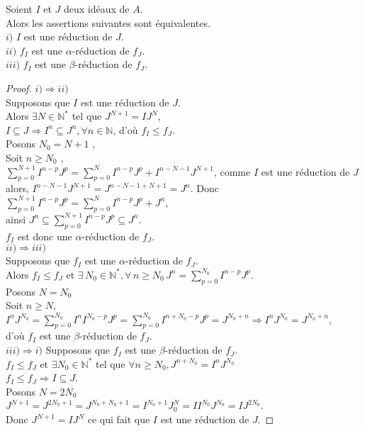 \begin{maproposition}
	Soient $I$ et $J$ deux idéaux de $A$.\\
	Alors les assertions suivantes sont équivalentes.\\
	$i)$ $I$ est une réduction de $J$.\\
	$ii)$ $f_I$ est une $\alpha$-réduction de $f_J$.\\
	$iii)$ $f_I$ est une $\beta$-réduction de $f_J$.
\end{maproposition}
\begin{proof}
	$i) \Rightarrow ii)$\\
	Supposons que $I$ est une réduction de $J$.\\
	Alors $\exists N \in \mathbb{N^*}$ tel que $J^{N+1} = IJ^N$,\\ $I \subseteq J \Rightarrow I^n \subseteq J^n , \forall n \in \mathbb{N}$, d'où $f_I \leq f_J$.\\
	Posons $N_0 = N+1$ , \\
	Soit $n \geq N_0$ , \\
	$\displaystyle \sum_{p=0}^{N+1}{I^{n-p} J^{p}} = \displaystyle \sum_{p=0}^{N}{I^{n-p} J^{p}} + I^{n-N-1} J^{N+1}$, comme $I$ est une réduction de $J$ alors, $I^{n-N-1} J^{N+1} = J^{n-N-1+N+1} = J^n$. Donc $\displaystyle \sum_{p=0}^{N+1}{I^{n-p} J^{p}} = \displaystyle \sum_{p=0}^{N}{I^{n-p} J^{p}} + J^{n}$,\\ ainsi $J^n \subseteq \displaystyle \sum_{p=0}^{N+1}{I^{n-p} J^{p}} \subseteq J^n$.\\
	$f_I$ est donc une $\alpha$-réduction de $f_J$.\\
	$ii) \Rightarrow iii)$\\
	Supposons que $f_I$ est une $\alpha$-réduction de $f_J$.\\
	Alors $f_I \leq f_J$ et $\exists \, N_0 \in \mathbb{N^*} , \forall \, n \geq N_0 \, J^n = \displaystyle \sum_{p=0}^{N_0}{I^{n-p} J^{p}}$.\\
	Posons $N = N_0$\\
	Soit $n \geq N$, \\
	$I^n J^{N_0} = \displaystyle \sum_{p=0}^{N_0}{I^n I^{N_0-p} J^{p}} = \displaystyle \sum_{p=0}^{N_0}{I^{n+N_0-p} J^{p}} = J^{N_0+n} \Rightarrow I^n J^{N_0} = J^{N_0+n}$,\\d'où $f_I$ est une $\beta$-réduction de $f_J$.\\
	$iii) \Rightarrow i)$
	Supposons que $f_I$ est une $\beta$-réduction de $f_J$.\\
	$f_I \leq f_J$ et $\exists N_0 \in \mathbb{N^*}$ tel que $\forall n \geq N_0 , J^{n+N_0} = I^n J^{N_0}$\\
	$f_I \leq f_J \Rightarrow I \subseteq J$.\\
	Posons $N = 2N_0$\\
	$J^{N+1} = J^{2N_0+1} = J^{N_0+N_0+1} = I^{N_0+1} J^N_0 = I I^{N_0} J^{N_0} = IJ^{2N_0}$.\\ Donc $J^{N+1}= IJ^{N}$ ce qui fait que $I$ est une réduction de $J$.
\end{proof}
